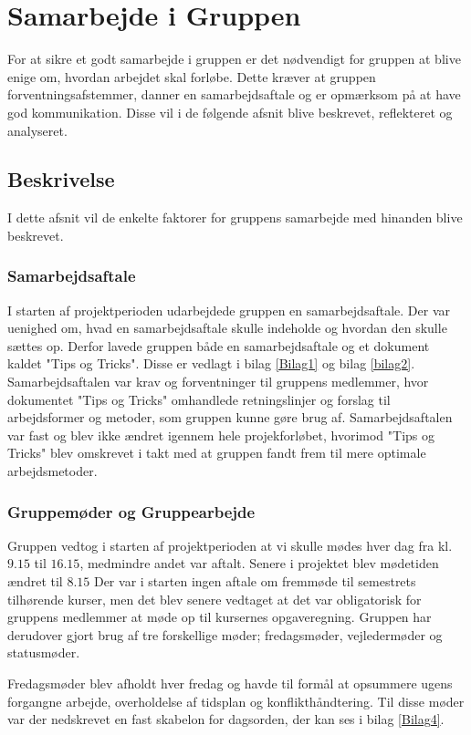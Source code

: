\chapter{Samarbejde i Gruppen}
For at sikre et godt samarbejde i gruppen er det nødvendigt for gruppen at blive enige om, hvordan arbejdet skal forløbe. Dette kræver at gruppen forventningsafstemmer, danner en samarbejdsaftale og er opmærksom på at have god kommunikation. Disse vil i de følgende afsnit blive beskrevet, reflekteret og analyseret.

\section{Beskrivelse}
I dette afsnit vil de enkelte faktorer for gruppens samarbejde med hinanden blive beskrevet. 

\subsection{Samarbejdsaftale}
I starten af projektperioden udarbejdede gruppen en samarbejdsaftale. Der var uenighed om, hvad en samarbejdsaftale skulle indeholde og hvordan den skulle sættes op. Derfor lavede gruppen både en samarbejdsaftale og et dokument kaldet "Tips og Tricks". Disse er vedlagt i bilag \ref{Bilag1} og bilag \ref{bilag2}. Samarbejdsaftalen var krav og forventninger til gruppens medlemmer, hvor dokumentet "Tips og Tricks" omhandlede retningslinjer og forslag til arbejdsformer og metoder, som gruppen kunne gøre brug af. Samarbejdsaftalen var fast og blev ikke ændret igennem hele projekforløbet, hvorimod "Tips og Tricks" blev omskrevet i takt med at gruppen fandt frem til mere optimale arbejdsmetoder. 

\subsection{Gruppemøder og Gruppearbejde}
Gruppen vedtog i starten af projektperioden at vi skulle mødes hver dag fra kl. $9.15$ til $16.15$, medmindre andet var aftalt. Senere i projektet blev mødetiden ændret til $8.15$ Der var i starten ingen aftale om fremmøde til semestrets tilhørende kurser, men det blev senere vedtaget at det var obligatorisk for gruppens medlemmer at møde op til kursernes opgaveregning.
Gruppen har derudover gjort brug af tre forskellige møder; fredagsmøder, vejledermøder og statusmøder.

Fredagsmøder blev afholdt hver fredag og havde til formål at opsummere ugens forgangne arbejde, overholdelse af tidsplan og konflikthåndtering. Til disse møder var der nedskrevet en fast skabelon for dagsorden, der kan ses i bilag \ref{Bilag4}.

